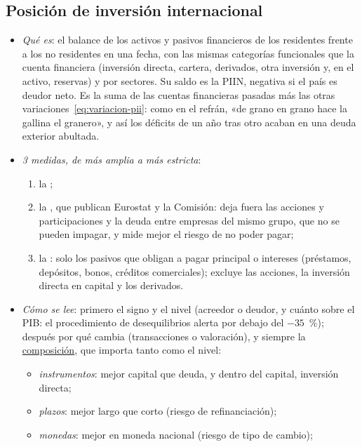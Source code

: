 \documentclass[11pt]{article}
\begin{document}
\subsection{Posición de inversión internacional}\label{sec:pii}

\begin{itemize}
\item \emph{Qué es}: el balance de los activos y pasivos financieros de los residentes frente a los no residentes en una fecha, con las mismas categorías funcionales que la cuenta financiera (inversión directa, cartera, derivados, otra inversión y, en el activo, reservas) y por sectores\nocite{FMI2009MBP6}. Su saldo es la PIIN, negativa si el país es deudor neto. Es la suma de las cuentas financieras pasadas más las otras variaciones~\eqref{eq:variacion-pii}: como en el refrán, «de grano en grano hace la gallina el granero», y así los déficits de un año tras otro acaban en una deuda exterior abultada.
\item \emph{3 medidas, de más amplia a más estricta}:
  \begin{enumerate}
  \item la ;
  \item la , que publican Eurostat y la Comisión: deja fuera las acciones y participaciones y la deuda entre empresas del mismo grupo, que no se pueden impagar, y mide mejor el riesgo de no poder pagar\nocite{Eurostat2026MIPExterior};
  \item la : solo los pasivos que obligan a pagar principal o intereses (préstamos, depósitos, bonos, créditos comerciales); excluye las acciones, la inversión directa en capital y los derivados\nocite{FMI2014DeudaExterna}.
  \end{enumerate}
\item \emph{Cómo se lee}: primero el signo y el nivel (acreedor o deudor, y cuánto sobre el PIB: el procedimiento de desequilibrios alerta por debajo del $-35$~\%)\nocite{CE2025AMR2026}; después por qué cambia (transacciones o valoración), y siempre la \uline{composición}, que importa tanto como el nivel:
  \begin{itemize}
  \item \emph{instrumentos}: mejor capital que deuda, y dentro del capital, inversión directa;
  \item \emph{plazos}: mejor largo que corto (riesgo de refinanciación);
  \item \emph{monedas}: mejor en moneda nacional (riesgo de tipo de cambio);

\end{itemize}
\end{itemize}
\end{document}
